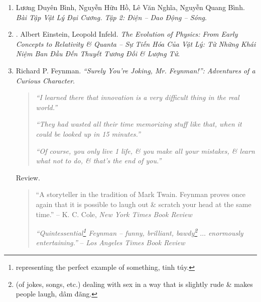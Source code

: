 \documentclass{article}
\begin{document}
\begin{enumerate}
	\item Lương Duyên Bình, Nguyễn Hữu Hồ, Lê Văn Nghĩa, Nguyễn Quang Bình. {\it Bài Tập Vật Lý Đại Cương. Tập 2: Điện -- Dao Động -- Sóng}.
	\item \cite{Einstein_Infeld_tien_hoa_Vat_Ly}. Albert Einstein, Leopold Infeld. {\it The Evolution of Physics: From Early Concepts to Relativity \& Quanta -- Sự Tiến Hóa Của Vật Lý: Từ Những Khái Niệm Ban Đầu Đến Thuyết Tương Đối \& Lượng Tử}.\hfill{\sf[done]}
	\item {\sc Richard P. Feynman}. {\it``Surely You're Joking, Mr. Feynman!'': Adventures of a Curious Character}.
	\begin{quotation}
		{\it``I learned there that innovation is a very difficult thing in the real world.''}
		
		{\it``They had wasted all their time memorizing stuff like that, when it could be looked up in 15 minutes.''}
		
		{\it``Of course, you only live 1 life, \& you make all your mistakes, \& learn what not to do, \& that's the end of you.''}
	\end{quotation}
	{\sf Review.}
	\begin{quotation}
		``A storyteller in the tradition of {\sc Mark Twain}. {\sf Feynman} proves once again that it is possible to laugh out \& scratch your head at the same time.'' -- K. C. Cole, {\it New York Times Book Review}
		
		{\it``Quintessential\footnote{representing the perfect example of something, tinh túy.} Feynman -- funny, brilliant, bawdy\footnote{(of jokes, songs, etc.) dealing with sex in a way that is slightly rude \& makes people laugh, dâm đãng.} $\ldots$ enormously entertaining.''} -- {\it Los Angeles Times Book Review}
		

\end{quotation}
\end{enumerate}
\end{document}
